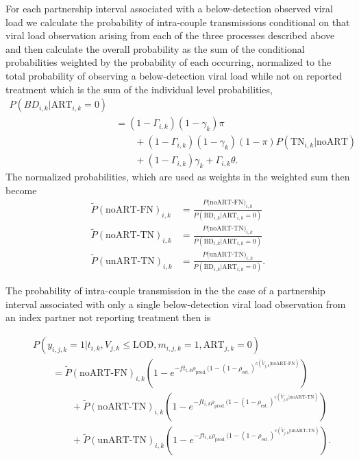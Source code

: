 \documentclass{article}[11pt]
\begin{document}
For each partnership interval associated with a below-detection observed viral load we calculate the probability of intra-couple transmissions conditional on that viral load observation arising from each of the three processes described above and then calculate the overall probability as the sum of the conditional probabilities weighted by the probability of each occurring, normalized to the total probability of observing a below-detection viral load while not on reported treatment which is the sum of the individual level probabilities,
\begin{equation}
\begin{split}
P(BD_{i,k}|\text{ART}_{i,k}=0) \\
&=(1-\Gamma_{i,k})(1-\gamma_k)\pi \\
&\qquad + (1-\Gamma_{i,k})(1-\gamma_k)(1-\pi)P(\text{TN}_{i,k}|\text{noART})\\
&\qquad+(1-\Gamma_{i,k})\gamma_k+\Gamma_{i,k}\theta.
\end{split}
\end{equation}
The normalized probabilities, which are used as weights in the weighted sum then become
\begin{align}
\tilde{P}(\text{noART-FN})_{i,k} &= \frac{P(\text{noART-FN)}_{i,k}}{P(\text{BD}_{i,k}|\text{ART}_{i,k}=0)} \\
\tilde{P}(\text{noART-TN})_{i,k} &= \frac{P(\text{noART-TN)}_{i,k}}{P(\text{BD}_{i,k}|\text{ART}_{i,k}=0)} \\
\tilde{P}(\text{unART-TN})_{i,k} &= \frac{P(\text{unART-TN)}_{i,k}}{P(\text{BD}_{i,k}|\text{ART}_{i,k}=0)}.
\end{align}

The probability of intra-couple transmission in the the case of a partnership interval associated with only a single below-detection viral load observation from an index partner not reporting treatment then is

\begin{equation}
\begin{split}
&P(y_{i,j,k}=1|t_{i,k},V_{j,k}\leq\text{LOD},m_{i,j,k}=1,\text{ART}_{j,k}=0) \\
    &\qquad= \tilde{P}(\text{noART-FN})_{i,k}\left(1 - e^{-ft_{i,k}\rho_\text{prod.}(1-(1-\rho_\text{est.})^{c(\tilde{V}_{j,k}|\text{noART-FN})}}\right) \\
    &\qquad\qquad + \tilde{P}(\text{noART-TN})_{i,k}\left(1 - e^{-ft_{i,k}\rho_\text{prod.}(1-(1-\rho_\text{est.})^{c(\tilde{V}_{j,k}|\text{noART-TN})}}\right) \\
    &\qquad\qquad + \tilde{P}(\text{unART-TN})_{i,k}\left(1 - e^{-ft_{i,k}\rho_\text{prod.}(1-(1-\rho_\text{est.})^{c(\tilde{V}_{j,k}|\text{unART-TN})}}\right).
\end{split}
\end{equation}
\end{document}
